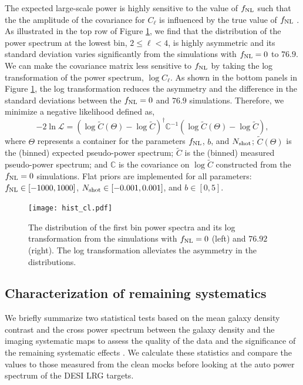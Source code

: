 The expected large-scale power is highly sensitive to the value of $f_{\rm NL}$ such that the the amplitude of the covariance for $C_{\ell}$ is influenced by the true value of $f_{\rm NL}$ \citep[see, e.g.,][for a discussion]{2013MNRAS.428.1116R}. As illustrated in the top row of Figure \ref{fig:histcell}, we find that the distribution of the power spectrum at the lowest bin, $2\leq \ell < 4$, is highly asymmetric and its standard deviation varies significantly from the simulations with $f_{\rm NL}=0$ to $76.9$. We can make the covariance matrix less sensitive to $f_{\rm NL}$ by taking the log transformation of the power spectrum, $\log C_{\ell}$. As shown in the bottom panels in Figure \ref{fig:histcell}, the log transformation reduces the asymmetry and the difference in the standard deviations between the $f_{\rm NL}=0$ and $76.9$ simulations. Therefore, we minimize a negative likelihood defined as,
\begin{equation}
-2\ln\mathcal{L} = (\log \tilde{C}(\Theta)-\log \tilde{C})^{\dagger} \mathbb{C}^{-1} (\log \tilde{C}(\Theta)-\log \tilde{C}),
\end{equation}
where $\Theta$ represents a container for the parameters $f_{\rm NL}$, $b$, and $N_{\rm shot}$; $\tilde{C}(\Theta)$ is the (binned) expected pseudo-power spectrum; $\tilde{C}$ is the (binned) measured pseudo-power spectrum; and $\mathbb{C}$ is the covariance on $\log\tilde{C}$ constructed from the $f_{\rm NL}=0$ simulations. Flat priors are implemented for all parameters: $f_{\rm NL} \in [-1000, 1000]$, $N_{\rm shot} \in [-0.001, 0.001]$, and $b \in [0, 5]$. 

\begin{figure}
\centering
\texttt{[image: hist\_cl.pdf]}
\caption{The distribution of the first bin power spectra and its log transformation from the simulations with $f_{\rm NL}=0$ (left) and $76.92$ (right). The log transformation alleviates the asymmetry in the distributions.}\label{fig:histcell}
\end{figure}




\subsection{Characterization of remaining systematics}
\label{ssec:characterization}
We briefly summarize two statistical tests based on the mean galaxy density contrast and the cross power spectrum between the galaxy density and the imaging systematic maps to assess the quality of the data and the significance of the remaining systematic effects \cite[see, also,][]{rezaie2021primordial}. We calculate these statistics and compare the values to those measured from the clean mocks before looking at the auto power spectrum of the DESI LRG targets.

